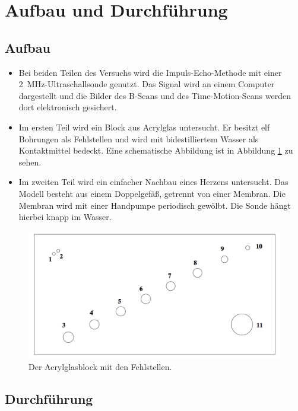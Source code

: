 \section{Aufbau und Durchführung}
\label{sec:Durchführung}

\subsection{Aufbau}

\begin{itemize}
  \item Bei beiden Teilen des Versuchs wird die Impuls-Echo-Methode mit einer
    \SI{2}{\mega\hertz}-Ultraschallsonde genutzt. Das Signal wird an einem Computer dargestellt und
    die Bilder des B-Scans und des Time-Motion-Scans werden dort elektronisch
    gesichert.
  \item Im ersten Teil wird ein Block aus Acrylglas untersucht. Er besitzt
    elf Bohrungen als Fehlstellen und wird mit bidestilliertem Wasser als
    Kontaktmittel bedeckt. Eine schematische Abbildung ist in Abbildung
    \ref{fig:acrylblock} zu sehen.
  \item Im zweiten Teil wird ein einfacher Nachbau eines Herzens untersucht.
    Das Modell besteht aus einem Doppelgefäß, getrennt von einer Membran. Die
    Membran wird mit einer Handpumpe periodisch gewölbt. Die Sonde hängt hierbei
    knapp im Wasser.
\end{itemize}

\begin{figure}
  \centering
  \includegraphics[width=\textwidth]{Pics/block.pdf}
  \caption{Der Acrylglasblock mit den Fehlstellen.\cite{anleitung}}
  \label{fig:acrylblock}
\end{figure}

\subsection{Durchführung}

